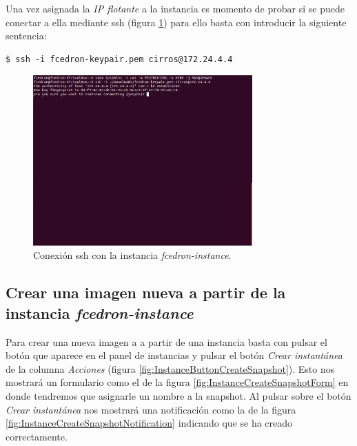 \documentclass{article}
\begin{document}
	Una vez asignada la \emph{IP flotante} a la instancia es momento de probar si se puede conectar a ella mediante ssh (figura \ref{fig:InstanceSSH}) para ello basta con introducir la siguiente sentencia:
\begin{lstlisting}[style=miniBash]
$ ssh -i fcedron-keypair.pem cirros@172.24.4.4
\end{lstlisting}		

\begin{figure}[h]
  \centering
    \includegraphics[width=0.75\textwidth]{img/m_054.png}
  \caption{Conexión ssh con la instancia \emph{fcedron-instance}.}
  \label{fig:InstanceSSH}
\end{figure}	
	
\clearpage
\subsection{Crear una imagen nueva a partir de la instancia \emph{fcedron-instance}}\label{sec:CreateSnapshot}
	Para crear una nueva imagen a a partir de una instancia basta con pulsar el botón que aparece en el panel de instancias y pulsar el botón \emph{Crear instantánea} de la columna \emph{Acciones} (figura \ref{fig:InstanceButtonCreateSnapshot}). Esto nos mostrará un formulario como el de la figura \ref{fig:InstanceCreateSnapshotForm} en donde tendremos que asignarle un nombre a la snapshot. Al pulsar sobre el botón \emph{Crear instantánea} nos mostrará una notificación como la de la figura \ref{fig:InstanceCreateSnapshotNotification} indicando que se ha creado correctamente.
\end{document}
